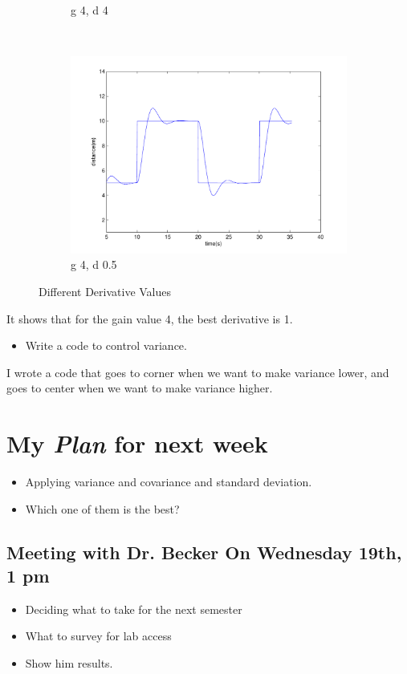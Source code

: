 \begin{figure}
\begin{subfigure}[b]{0.3\textwidth}
                \caption{g 4, d 4}
                \label{fig:tiger}
        \end{subfigure}
        ~ %
        \begin{subfigure}[b]{0.3\textwidth}
                \includegraphics[width=\textwidth]{fig/gain4d05.pdf}
                \caption{g 4, d 0.5}
                \label{fig:mouse}
        \end{subfigure}
         \caption{Different Derivative Values}\label{fig:animals}
\end{figure}

It shows that for the gain value 4, the best derivative is 1.

\begin{itemize}
\item Write a code to control variance.
\end{itemize}

I wrote a code that goes to corner when we want to make variance lower, and goes to center when we want to make variance higher.


\section{My \emph{Plan} for next week}

\begin{itemize}
\item Applying variance and covariance and standard deviation. 
\item Which one of them is the best?
\end{itemize}

\subsection{Meeting with Dr. Becker On Wednesday 19th, 1 pm }

\begin{itemize}
\item Deciding what to take for the next semester
\item What to survey for lab access
\item Show him results.
\end{itemize}


